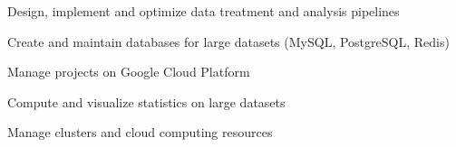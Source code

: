 

\begin{cvskills}

  \begin{minipage}[t]{0.45\textwidth}
    \cvskill
      {Design, implement and optimize data treatment and analysis pipelines}
  \end{minipage}\hfill
  \begin{minipage}[t]{0.45\textwidth}
    \cvskill
      {Create and maintain databases for large datasets (MySQL, PostgreSQL, Redis)}
  \end{minipage}

  \begin{minipage}[t]{0.45\textwidth}
    \cvskill
      {Manage projects on Google Cloud Platform}
  \end{minipage}\hfill
  \begin{minipage}[t]{0.45\textwidth}
    \cvskill
      {Compute and visualize statistics on large datasets}
  \end{minipage}

  \begin{minipage}[t]{0.45\textwidth}
    \cvskill
      {Manage clusters and cloud computing resources}
  \end{minipage}\hfill
  \begin{minipage}[t]{0.45\textwidth}
    
  \end{minipage}

\end{cvskills}
